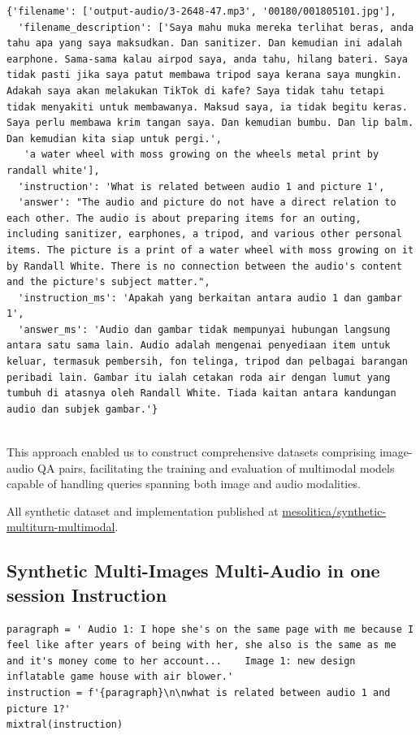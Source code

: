 \documentclass[preprint]{article}
\begin{document}
\begin{lstlisting}[breaklines=true]
  {'filename': ['output-audio/3-2648-47.mp3', '00180/001805101.jpg'],
  'filename_description': ['Saya mahu muka mereka terlihat beras, anda tahu apa yang saya maksudkan. Dan sanitizer. Dan kemudian ini adalah earphone. Sama-sama kalau airpod saya, anda tahu, hilang bateri. Saya tidak pasti jika saya patut membawa tripod saya kerana saya mungkin. Adakah saya akan melakukan TikTok di kafe? Saya tidak tahu tetapi tidak menyakiti untuk membawanya. Maksud saya, ia tidak begitu keras. Saya perlu membawa krim tangan saya. Dan kemudian bumbu. Dan lip balm. Dan kemudian kita siap untuk pergi.',
   'a water wheel with moss growing on the wheels metal print by randall white'],
  'instruction': 'What is related between audio 1 and picture 1',
  'answer': "The audio and picture do not have a direct relation to each other. The audio is about preparing items for an outing, including sanitizer, earphones, a tripod, and various other personal items. The picture is a print of a water wheel with moss growing on it by Randall White. There is no connection between the audio's content and the picture's subject matter.",
  'instruction_ms': 'Apakah yang berkaitan antara audio 1 dan gambar 1',
  'answer_ms': 'Audio dan gambar tidak mempunyai hubungan langsung antara satu sama lain. Audio adalah mengenai penyediaan item untuk keluar, termasuk pembersih, fon telinga, tripod dan pelbagai barangan peribadi lain. Gambar itu ialah cetakan roda air dengan lumut yang tumbuh di atasnya oleh Randall White. Tiada kaitan antara kandungan audio dan subjek gambar.'}
 
\end{lstlisting}

This approach enabled us to construct comprehensive datasets comprising image-audio QA pairs, facilitating the training and evaluation of multimodal models capable of handling queries spanning both image and audio modalities.

All synthetic dataset and implementation published at \href{https://huggingface.co/datasets/mesolitica/synthetic-multiturn-multimodal#multi-images-multi-audio}{mesolitica/synthetic-multiturn-multimodal}.

\subsection{Synthetic Multi-Images Multi-Audio in one session Instruction}

\begin{lstlisting}[breaklines=true]
paragraph = ' Audio 1: I hope she's on the same page with me because I feel like after years of being with her, she also is the same as me and it's money come to her account...    Image 1: new design inflatable game house with air blower.'
instruction = f'{paragraph}\n\nwhat is related between audio 1 and picture 1?'
mixtral(instruction)
\end{lstlisting}
\end{document}
